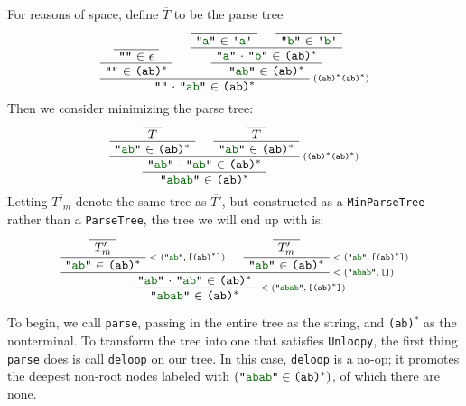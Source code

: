 \documentclass[preprint]{sigplanconf}
\newcommand{\str}[1]{\texttt{"\textcolor{DarkGreen}{#1}"}}
\newcommand{\regex}[1]{\texttt{#1}}
\newcommand{\terminal}[1]{\texttt{\textquotesingle\textcolor{DarkGreen}{#1}\textquotesingle}}
\newcommand{\fname}[1]{\texttt{#1}}
\newcommand{\nil}{\texttt{[]}}
\newcommand{\llstrcat}[2]{#1 \ensuremath{\cdot} #2}
\newcommand{\indname}[1]{\texttt{#1}}
\newcommand{\minparsetreeannot}[2]{\ensuremath{<(#1,#2)}}
\newcommand{\valuelist}[1]{\texttt{[}#1\texttt{]}}
\begin{document}
    For reasons of space, define $\overline{T}$ to be the parse tree
    \[
      \AxiomC{} \UnaryInfC{\str{} $\in$ $\epsilon$}
      \UnaryInfC{\str{} $\in$ \regex{(ab)$^*$}}
      \AxiomC{}\UnaryInfC{\str{a} $\in$ \terminal{a}}
      \AxiomC{}\UnaryInfC{\str{b} $\in$ \terminal{b}}
      \BinaryInfC{\llstrcat{\str{a}}{\str{b}} $\in$ \regex{(ab)$^*$}}
      \UnaryInfC{\str{ab} $\in$ \regex{(ab)$^*$}}
      \RightLabel{\scriptsize(\regex{(ab)$^*$(ab)$^*$})}
      \BinaryInfC{\llstrcat{\str{}}{\str{ab}} $\in$ \regex{(ab)$^*$}}
    \DisplayProof
    \]
    Then we consider minimizing the parse tree:
    \[
      \AxiomC{}
      \UnaryInfC{$T$}
      \UnaryInfC{\str{ab} $\in$ \regex{(ab)$^*$}}
      \AxiomC{}
      \UnaryInfC{$T$}
      \UnaryInfC{\str{ab} $\in$ \regex{(ab)$^*$}}
      \RightLabel{\scriptsize(\regex{(ab)$^*$(ab)$^*$})}
      \BinaryInfC{\llstrcat{\str{ab}}{\str{ab}} $\in$ \regex{(ab)$^*$}}
      \UnaryInfC{\str{abab} $\in$ \regex{(ab)$^*$}}
    \DisplayProof
    \]
    Letting $\overline{T'_m}$ denote the same tree as $\overline{T'}$, but constructed as a \indname{MinParseTree} rather than a \indname{ParseTree},
    the tree we will end up with is:
    \[
      \AxiomC{}\UnaryInfC{$T'_m$}
      \RightLabel{\scriptsize\minparsetreeannot{\str{ab}}{\valuelist{\regex{(ab)$^*$}}}}
      \UnaryInfC{\str{ab} $\in$ \regex{(ab)$^*$}}
      \AxiomC{}\UnaryInfC{$T'_m$}
      \RightLabel{\scriptsize\minparsetreeannot{\str{ab}}{\valuelist{\regex{(ab)$^*$}}}}
      \UnaryInfC{\str{ab} $\in$ \regex{(ab)$^*$}}
      \RightLabel{\scriptsize\minparsetreeannot{\str{abab}}{\nil}}
      \BinaryInfC{\llstrcat{\str{ab}}{\str{ab}} $\in$ \regex{(ab)$^*$}}
      \RightLabel{\scriptsize\minparsetreeannot{\str{abab}}{\valuelist{\regex{(ab)$^*$}}}}
      \UnaryInfC{\str{abab} $\in$ \regex{(ab)$^*$}}
    \DisplayProof
    \]

    To begin, we call \fname{parse}, passing in the entire tree as the string, and \regex{(ab)$^*$} as the nonterminal.  To transform the tree into one that satisfies \fname{Unloopy}, the first thing \fname{parse} does is call \fname{deloop} on our tree.  In this case, \fname{deloop} is a no-op; it promotes the deepest non-root nodes labeled with $(\str{abab}\in\regex{(ab)$^*$})$, of which there are none.
\end{document}
